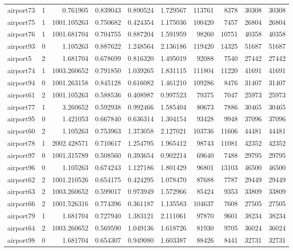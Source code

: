 \begin{longtable}{|l|r|r|r|r|r|r|r|r|r|}
airport73 & 1 & 0.761905 & 0.839043 & 0.890524 & 1.729567 & 113761 & 8378 & 30308 & 30308 \\
airport75 & 1 & 1001.105263 & 0.750682 & 0.424354 & 1.175036 & 100420 & 7457 & 26804 & 26804 \\
airport76 & 1 & 1001.681704 & 0.704755 & 0.887204 & 1.591959 & 98260 & 10751 & 40358 & 40358 \\
airport93 & 0 & 1.105263 & 0.887622 & 1.248564 & 2.136186 & 119420 & 14325 & 51687 & 51687 \\
airport5 & 2 & 1.681704 & 0.678699 & 0.816320 & 1.495019 & 92088 & 7540 & 27442 & 27442 \\
airport74 & 1 & 1003.260652 & 0.791850 & 1.039265 & 1.831115 & 111804 & 11220 & 41691 & 41691 \\
airport94 & 0 & 1001.263158 & 0.845128 & 0.616082 & 1.461210 & 109286 & 8476 & 31407 & 31407 \\
airport61 & 2 & 1001.105263 & 0.588536 & 0.408987 & 0.997523 & 79375 & 7047 & 25973 & 25973 \\
airport77 & 1 & 3.260652 & 0.592938 & 0.992466 & 1.585404 & 80673 & 7886 & 30465 & 30465 \\
airport95 & 0 & 1.421053 & 0.667840 & 0.636314 & 1.304154 & 93428 & 9948 & 37096 & 37096 \\
airport60 & 2 & 1.105263 & 0.753963 & 1.373058 & 2.127021 & 103736 & 11606 & 44481 & 44481 \\
airport78 & 1 & 2002.428571 & 0.710617 & 1.254795 & 1.965412 & 98743 & 11081 & 42352 & 42352 \\
airport97 & 0 & 1001.315789 & 0.508560 & 0.393654 & 0.902214 & 69640 & 7488 & 29795 & 29795 \\
airport96 & 0 & 1.105263 & 0.674243 & 1.127186 & 1.801429 & 96801 & 13103 & 46500 & 46500 \\
airport62 & 2 & 1001.210526 & 0.654175 & 0.424295 & 1.078470 & 87688 & 7787 & 29449 & 29449 \\
airport63 & 2 & 1003.260652 & 0.599017 & 0.973949 & 1.572966 & 85424 & 9353 & 33809 & 33809 \\
airport66 & 2 & 1001.526316 & 0.774396 & 0.361187 & 1.135583 & 104637 & 7608 & 27505 & 27505 \\
airport79 & 1 & 1.681704 & 0.727940 & 1.383121 & 2.111061 & 97870 & 9601 & 38234 & 38234 \\
airport64 & 2 & 1003.260652 & 0.569590 & 1.049136 & 1.618726 & 81930 & 9705 & 36024 & 36024 \\
airport98 & 0 & 1.681704 & 0.654307 & 0.949080 & 1.603387 & 88426 & 8441 & 32731 & 32731 \\

\end{longtable}
